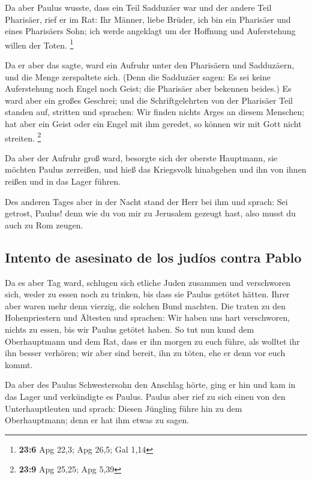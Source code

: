  Da aber Paulus wusste, dass ein Teil Sadduzäer war und
der andere Teil Pharisäer, rief er im Rat: Ihr Männer, liebe Brüder, ich
bin ein Pharisäer und eines Pharisäers Sohn; ich werde angeklagt um der
Hoffnung und Auferstehung willen der Toten. \footnote{\textbf{23:6} Apg
  22,3; Apg 26,5; Gal 1,14}

 Da er aber das sagte, ward ein Aufruhr unter den
Pharisäern und Sadduzäern, und die Menge zerspaltete sich.
 (Denn die Sadduzäer sagen: Es sei keine Auferstehung noch
Engel noch Geist; die Pharisäer aber bekennen beides.)  Es
ward aber ein großes Geschrei; und die Schriftgelehrten von der
Pharisäer Teil standen auf, stritten und sprachen: Wir finden nichts
Arges an diesem Menschen; hat aber ein Geist oder ein Engel mit ihm
geredet, so können wir mit Gott nicht streiten. \footnote{\textbf{23:9}
  Apg 25,25; Apg 5,39}

 Da aber der Aufruhr groß ward, besorgte sich der oberste
Hauptmann, sie möchten Paulus zerreißen, und hieß das Kriegsvolk
hinabgehen und ihn von ihnen reißen und in das Lager führen.

 Des anderen Tages aber in der Nacht stand der Herr bei
ihm und sprach: Sei getrost, Paulus! denn wie du von mir zu Jerusalem
gezeugt hast, also musst du auch zu Rom zeugen.

\hypertarget{intento-de-asesinato-de-los-juduxedos-contra-pablo}{%
\subsection{Intento de asesinato de los judíos contra
Pablo}\label{intento-de-asesinato-de-los-juduxedos-contra-pablo}}

 Da es aber Tag ward, schlugen sich etliche Juden
zusammen und verschworen sich, weder zu essen noch zu trinken, bis dass
sie Paulus getötet hätten.  Ihrer aber waren mehr denn
vierzig, die solchen Bund machten.  Die traten zu den
Hohenpriestern und Ältesten und sprachen: Wir haben uns hart
verschworen, nichts zu essen, bis wir Paulus getötet haben.
 So tut nun kund dem Oberhauptmann und dem Rat, dass er
ihn morgen zu euch führe, als wolltet ihr ihn besser verhören; wir aber
sind bereit, ihn zu töten, ehe er denn vor euch kommt.

 Da aber des Paulus Schwestersohn den Anschlag hörte,
ging er hin und kam in das Lager und verkündigte es Paulus.
 Paulus aber rief zu sich einen von den Unterhauptleuten
und sprach: Diesen Jüngling führe hin zu dem Oberhauptmann; denn er hat
ihm etwas zu sagen.

